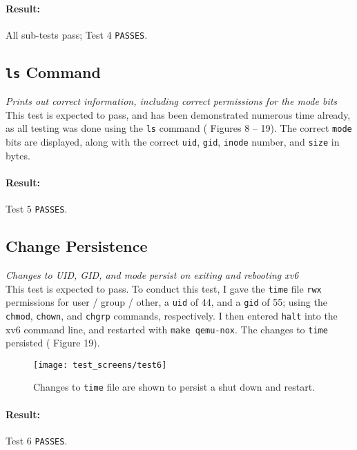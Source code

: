\documentclass[11pt,letterpaper]{report}
\begin{document}
	\paragraph{Result:} All sub-tests pass; Test 4 {\tt PASSES}.\\
	
	
	\subsection{{\tt ls} Command}
	\emph{Prints out correct information, including correct permissions for the mode bits}\\
	This test is expected to pass, and has been demonstrated numerous time already, as all testing was done using the {\tt ls} command ({\color{red} Figures 8 -- 19}). The correct {\tt mode} bits are displayed, along with the correct {\tt uid}, {\tt gid}, {\tt inode} number, and {\tt size} in bytes.
	\paragraph{Result:} Test 5 {\tt PASSES}.\\
	
	\subsection{Change Persistence}
	\emph{Changes to UID, GID, and mode persist on exiting and rebooting xv6}\\
	This test is expected to pass. To conduct this test, I gave the {\tt time} file {\tt rwx} permissions for user / group / other, a {\tt uid} of 44, and a {\tt gid} of 55; using the {\tt chmod}, {\tt chown}, and {\tt chgrp} commands, respectively. I then entered {\tt halt} into the xv6 command line, and restarted with {\tt make qemu-nox}. The changes to {\tt time} persisted ({\color{red} Figure 19}).
	
	\begin{figure}
		\centering
		\texttt{[image: test\_screens/test6]}
		\caption{Changes to {\tt time} file are shown to persist a shut down and restart.}
		\label{fig:test6}
	\end{figure}
	
	\paragraph{Result:} Test 6 {\tt PASSES}.\\
	
	
\end{document}
